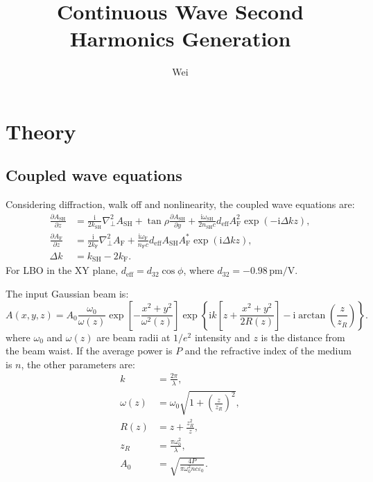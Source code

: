\documentclass[a4paper,10pt]{ctexart}
\title{Continuous Wave Second Harmonics Generation}
\author{Wei}
\date{}
\begin{document}
\maketitle

\section{Theory}

\subsection{Coupled wave equations}
Considering diffraction, walk off and nonlinearity, the coupled wave equations are:
\begin{equation}
  \begin{aligned}
    \frac{\partial A_{\mathrm{SH}}}{\partial z}
             & =\frac{\mathrm{i}}{2k_{\mathrm{SH}}}\nabla_\perp^2A_{\mathrm{SH}}
    +\tan\rho\frac{\partial A_{\mathrm{SH}}}{\partial y}
    +\frac{\mathrm{i}\omega_{\mathrm{SH}}}{2n_{\mathrm{SH}}c}
    d_{\mathrm{eff}}A_{\mathrm{F}}^2\exp(-\mathrm{i}\Delta kz),                  \\
    \frac{\partial A_{\mathrm{F}}}{\partial z}
             & =\frac{\mathrm{i}}{2k_{\mathrm{F}}}\nabla_\perp^2A_{\mathrm{F}}
    +\frac{\mathrm{i}\omega_{\mathrm{F}}}{n_{\mathrm{F}}c}
    d_{\mathrm{eff}}A_{\mathrm{SH}}A_{\mathrm{F}}^*
    \exp(\mathrm{i}\Delta kz),                                                   \\
    \Delta k & =k_{\mathrm{SH}}-2k_{\mathrm{F}}.
  \end{aligned}
  \label{eq:CWE}
\end{equation}
For LBO in the XY plane, $d_{\mathrm{eff}}=d_{32}\cos\phi$, where
$d_{32}=-0.98\,\mathrm{pm/V}$.

The input Gaussian beam is:
\begin{equation}
  A(x,y,z)=A_0\frac{\omega_0}{\omega(z)}
  \exp\left[-\frac{x^2+y^2}{\omega^2(z)}\right]
  \exp\left\{\mathrm{i}k\left[z+\frac{x^2+y^2}{2R(z)}\right]
  -\mathrm{i}\arctan\left(\frac{z}{z_R}\right)\right\}.
  \label{eq:gaussian-beam}
\end{equation}
where $\omega_0$ and $\omega(z)$ are beam radii at $1/e^2$ intensity and $z$ is the
distance from the beam waist. If the average power is $P$ and the refractive
index of the medium is $n$, the other parameters are:
\begin{equation}
  \begin{aligned}
    k         & =\frac{2\pi}{\lambda},                           \\
    \omega(z) & =\omega_0\sqrt{1+\left(\frac{z}{z_R}\right)^2},  \\
    R(z)      & =z+\frac{z_R^2}{z},                              \\
    z_R       & =\frac{\pi\omega_0^2}{\lambda},                  \\
    A_0       & =\sqrt{\frac{4P}{\pi\omega_0^2nc\varepsilon_0}}.
  \end{aligned}
\end{equation}
\end{document}
